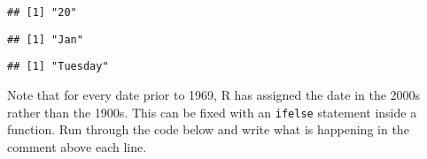 \documentclass[]{article}
\newenvironment{Shaded}{\begin{snugshade}}{\end{snugshade}}
\newcommand{\DataTypeTok}[1]{\textcolor[rgb]{0.13,0.29,0.53}{#1}}
\newcommand{\KeywordTok}[1]{\textcolor[rgb]{0.13,0.29,0.53}{\textbf{#1}}}
\newcommand{\NormalTok}[1]{#1}
\newcommand{\OperatorTok}[1]{\textcolor[rgb]{0.81,0.36,0.00}{\textbf{#1}}}
\newcommand{\StringTok}[1]{\textcolor[rgb]{0.31,0.60,0.02}{#1}}
\begin{document}
\begin{Shaded}
\end{Shaded}

\begin{verbatim}
## [1] "20"
\end{verbatim}

\begin{Shaded}
\end{Shaded}

\begin{verbatim}
## [1] "Jan"
\end{verbatim}

\begin{Shaded}
\end{Shaded}

\begin{verbatim}
## [1] "Tuesday"
\end{verbatim}

\begin{Shaded}
\end{Shaded}

Note that for every date prior to 1969, R has assigned the date in the
2000s rather than the 1900s. This can be fixed with an \texttt{ifelse}
statement inside a function. Run through the code below and write what
is happening in the comment above each line.
\end{document}
